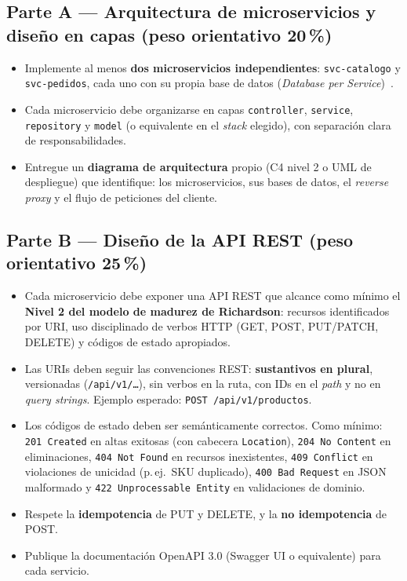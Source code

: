 \documentclass[11pt,a4paper]{article}
\begin{document}
\subsection*{Parte A --- Arquitectura de microservicios y diseño en capas (peso orientativo 20\,\%)}

\begin{itemize}[leftmargin=1.2em, itemsep=0.25em]
    \item Implemente al menos \textbf{dos microservicios independientes}: \texttt{svc-catalogo} y \texttt{svc-pedidos}, cada uno con su propia base de datos (\emph{Database per Service})~\cite{Richardson2018Patterns}.
    \item Cada microservicio debe organizarse en capas \texttt{controller}, \texttt{service}, \texttt{repository} y \texttt{model} (o equivalente en el \emph{stack} elegido), con separación clara de responsabilidades.
    \item Entregue un \textbf{diagrama de arquitectura} propio (C4 nivel 2 o UML de despliegue) que identifique: los microservicios, sus bases de datos, el \emph{reverse proxy} y el flujo de peticiones del cliente.
\end{itemize}

\subsection*{Parte B --- Diseño de la API REST (peso orientativo 25\,\%)}

\begin{itemize}[leftmargin=1.2em, itemsep=0.25em]
    \item Cada microservicio debe exponer una API REST que alcance como mínimo el \textbf{Nivel 2 del modelo de madurez de Richardson}: recursos identificados por URI, uso disciplinado de verbos HTTP (GET, POST, PUT/PATCH, DELETE) y códigos de estado apropiados.
    \item Las URIs deben seguir las convenciones REST: \textbf{sustantivos en plural}, versionadas (\texttt{/api/v1/\ldots}), sin verbos en la ruta, con IDs en el \emph{path} y no en \emph{query strings}. Ejemplo esperado: \texttt{POST /api/v1/productos}.
    \item Los códigos de estado deben ser semánticamente correctos. Como mínimo: \texttt{201 Created} en altas exitosas (con cabecera \texttt{Location}), \texttt{204 No Content} en eliminaciones, \texttt{404 Not Found} en recursos inexistentes, \texttt{409 Conflict} en violaciones de unicidad (p.\,ej.\ SKU duplicado), \texttt{400 Bad Request} en JSON malformado y \texttt{422 Unprocessable Entity} en validaciones de dominio.
    \item Respete la \textbf{idempotencia} de PUT y DELETE, y la \textbf{no idempotencia} de POST.
    \item Publique la documentación OpenAPI 3.0 (Swagger UI o equivalente) para cada servicio.
\end{itemize}
\end{document}
